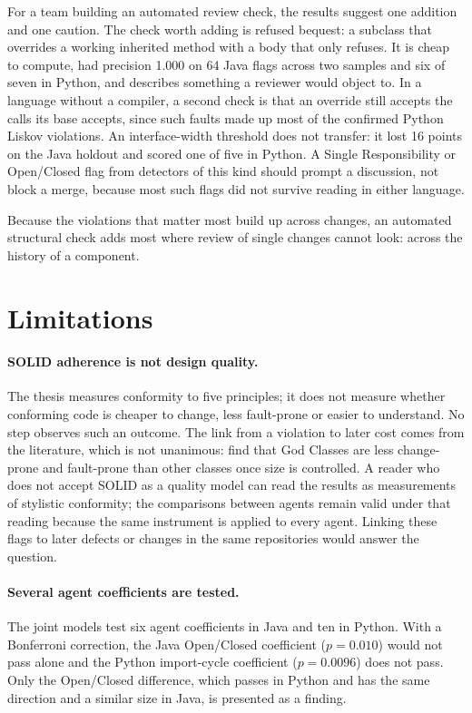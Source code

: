 For a team building an automated review check, the results suggest one addition and one caution. The
check worth adding is refused bequest: a subclass that overrides a working inherited method with a
body that only refuses. It is cheap to compute, had precision 1.000 on 64 Java flags across two
samples and six of seven in Python, and describes something a reviewer would object to. In a
language without a compiler, a second check is that an override still accepts the calls its base
accepts, since such faults made up most of the confirmed Python Liskov violations. An interface-width
threshold does not transfer: it lost 16 points on the Java holdout and scored one of five in Python.
A Single Responsibility or Open/Closed flag from detectors of this kind should prompt a discussion,
not block a merge, because most such flags did not survive reading in either language.

Because the violations that matter most build up across changes, an automated structural check adds
most where review of single changes cannot look: across the history of a component.

\section{Limitations}
\label{sec:limitations}

\paragraph{SOLID adherence is not design quality.} The thesis measures conformity to five
principles; it does not measure whether conforming code is cheaper to change, less fault-prone or
easier to understand. No step observes such an outcome. The link from a violation to later cost comes
from the literature, which is not unanimous: \citet{olbrich2010godclass} find that God Classes are
less change-prone and fault-prone than other classes once size is controlled. A reader who does not
accept SOLID as a quality model can read the results as measurements of stylistic conformity; the
comparisons between agents remain valid under that reading because the same instrument is applied to
every agent. Linking these flags to later defects or changes in the same repositories would answer
the question.

\paragraph{Several agent coefficients are tested.} The joint models test six agent coefficients in
Java and ten in Python. With a Bonferroni correction, the Java Open/Closed coefficient
($p = 0.010$) would not pass alone and the Python import-cycle coefficient ($p = 0.0096$) does not
pass. Only the Open/Closed difference, which passes in Python and has the same direction and a
similar size in Java, is presented as a finding.


